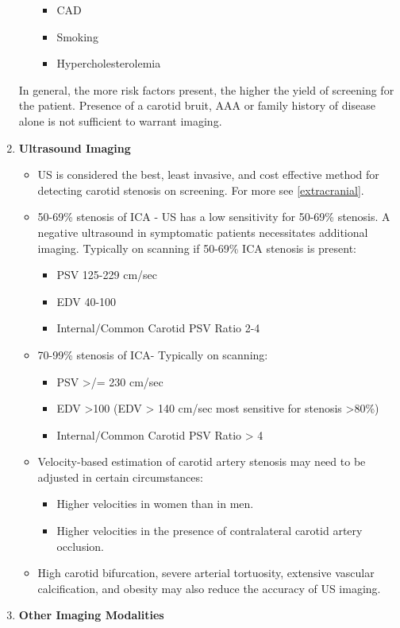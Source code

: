 \documentclass[
]{book}
\providecommand{\tightlist}{%
  \setlength{\itemsep}{0pt}\setlength{\parskip}{0pt}}
\begin{document}
\begin{enumerate}
\begin{itemize}
    \begin{itemize}
    \item
      CAD
    \item
      Smoking
    \item
      Hypercholesterolemia
    \end{itemize}
  \end{itemize}

  In general, the more risk factors present, the higher the yield of
  screening for the patient. Presence of a carotid bruit, AAA or
  family history of disease alone is not sufficient to warrant
  imaging.\citep{aburahma2022}
\item
  \textbf{Ultrasound Imaging}

  \begin{itemize}
  \item
    US is considered the best, least invasive, and cost effective
    method for detecting carotid stenosis on
    screening.\citep{shaalan2008} For more see \ref{extracranial}.
  \item
    50-69\% stenosis of ICA - US has a low sensitivity for 50-69\%
    stenosis. A negative ultrasound in symptomatic patients
    necessitates additional imaging. Typically on scanning if 50-69\%
    ICA stenosis is present:

    \begin{itemize}
    \tightlist
    \item
      PSV 125-229 cm/sec
    \item
      EDV 40-100
    \item
      Internal/Common Carotid PSV Ratio 2-4
    \end{itemize}
  \item
    70-99\% stenosis of ICA- Typically on scanning:

    \begin{itemize}
    \item
      PSV \textgreater/= 230 cm/sec
    \item
      EDV \textgreater100 (EDV \textgreater{} 140 cm/sec most sensitive for stenosis
      \textgreater80\%)
    \item
      Internal/Common Carotid PSV Ratio \textgreater{} 4
    \end{itemize}
  \item
    Velocity-based estimation of carotid artery stenosis may need to
    be adjusted in certain circumstances:

    \begin{itemize}
    \item
      Higher velocities in women than in men.
    \item
      Higher velocities in the presence of contralateral carotid
      artery occlusion.
    \end{itemize}
  \item
    High carotid bifurcation, severe arterial tortuosity, extensive
    vascular calcification, and obesity may also reduce the accuracy
    of US imaging.
  \end{itemize}
\item
  \textbf{Other Imaging Modalities}


\end{enumerate}
\end{document}
